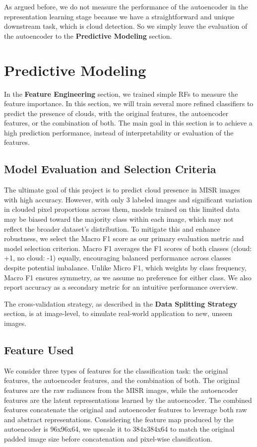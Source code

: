 \documentclass[10pt,letterpaper]{article}
\begin{document}
As argued before, we do not measure the performance of the autoencoder in the representation learning stage because we have a straightforward and unique downstream task, which is cloud detection. So we simply leave the evaluation of the autoencoder to the \textbf{Predictive Modeling} section.

\section{Predictive Modeling}
In the \textbf{Feature Engineering} section, we trained simple RFs to measure the feature importance. In this section, we will train several more refined classifiers to predict the presence of clouds, with the original features, the autoencoder features, or the combination of both. The main goal in this section is to achieve a high prediction performance, instead of interpretability or evaluation of the features.

\subsection{Model Evaluation and Selection Criteria}

The ultimate goal of this project is to predict cloud presence in MISR images with high accuracy. However, with only 3 labeled images and significant variation in clouded pixel proportions across them, models trained on this limited data may be biased toward the majority class within each image, which may not reflect the broader dataset's distribution. To mitigate this and enhance robustness, we select the Macro F1 score as our primary evaluation metric and model selection criterion. Macro F1 averages the F1 scores of both classes (cloud: +1, no cloud: -1) equally, encouraging balanced performance across classes despite potential imbalance. Unlike Micro F1, which weights by class frequency, Macro F1 ensures symmetry, as we assume no preference for either class. We also report accuracy as a secondary metric for an intuitive performance overview.

The cross-validation strategy, as described in the \textbf{Data Splitting Strategy} section, is at image-level, to simulate real-world application to new, unseen images.

\subsection{Feature Used}

We consider three types of features for the classification task: the original features, the autoencoder features, and the combination of both. The original features are the raw radiances from the MISR images, while the autoencoder features are the latent representations learned by the autoencoder. The combined features concatenate the original and autoencoder features to leverage both raw and abstract representations. Considering the feature map produced by the autoencoder is 96x96x64, we upscale it to 384x384x64 to match the original padded image size before concatenation and pixel-wise classification.
\end{document}
